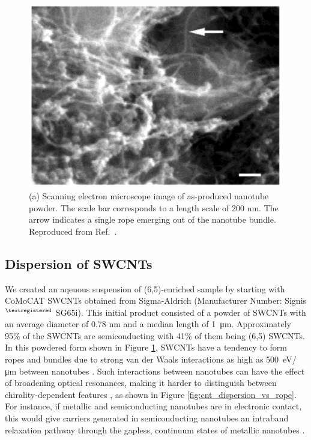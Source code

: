 \begin{figure}[ht]
	\centering
	\includegraphics[scale=0.3]{images/chapter_methods/sem_cnt_powder_bandy}
	\caption{(a) Scanning electron microscope image of as-produced nanotube powder. The scale bar corresponds to a length scale of 200 nm. The arrow indicates a single rope emerging out of the nanotube bundle. Reproduced from Ref.\ \cite{bandyopadhyaya2002stabilization}.}
	\label{fig:cnt_powder}
\end{figure}

\subsection{Dispersion of SWCNTs}
\label{section:dispersion_swcnt}
We created an aqeuous suspension of (6,5)-enriched sample by starting with CoMoCAT SWCNTs obtained from Sigma-Aldrich (Manufacturer Number: Signis$^{\tiny{\textregistered}}$ SG65i). This initial product consisted of a powder of SWCNTs with an average diameter of 0.78 nm and a median length of \SI{1}{\micro \meter}. Approximately 95\% of the SWCNTs are semiconducting with 41\% of them being (6,5) SWCNTs. In this powdered form shown in Figure \ref{fig:cnt_powder}, SWCNTs have a tendency to form ropes and bundles due to strong van der Waals interactions as high as \SI{500}{\electronvolt / \micro \meter} between nanotubes \cite{thess1996crystalline, girifalco2000carbon}. Such interactions between nanotubes can have the effect of broadening optical resonances, making it harder to distinguish between chirality-dependent features \cite{liu1998fullerene, o2001reversible, o2002band}, as shown in Figure \ref{fig:cnt_dispersion_vs_rope}. For instance, if metallic and semiconducting nanotubes are in electronic contact, this would give carriers generated in semiconducting nanotubes an intraband relaxation pathway through the gapless, continuum states of metallic nanotubes \cite{ostojic2004interband}.

